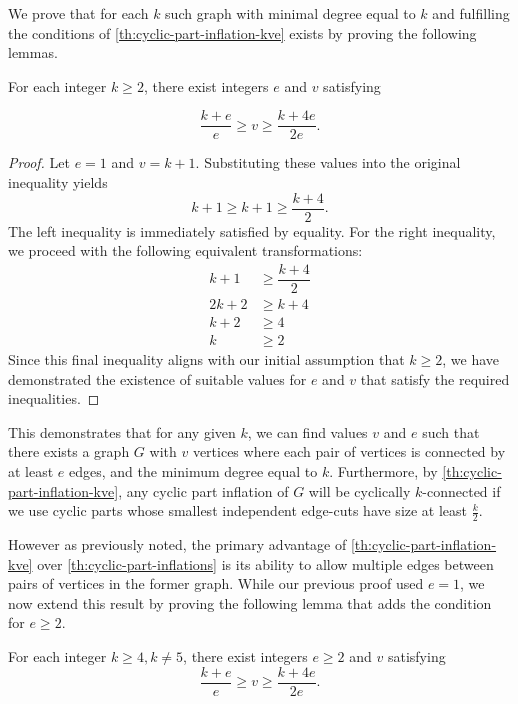 \documentclass[12pt, twoside]{book}
\begin{document}
We prove that for each $k$ such graph with minimal degree equal to $k$ and fulfilling the conditions of \cref{th:cyclic-part-inflation-kve} exists by proving the following lemmas.

\begin{lemma}
	For each integer $k\geq 2$, there exist integers $e$ and $v$ satisfying
	
	$$\dfrac{k+e}{e}\geq v\geq \dfrac{k+4e}{2e}.$$
\end{lemma}

\begin{proof}
	Let $e=1$ and $v=k+1$. Substituting these values into the original inequality yields
	$$k+1\geq k+1\geq \dfrac{k+4}{2}.$$
	The left inequality is immediately satisfied by equality. For the right inequality, we proceed with the following equivalent transformations:
	\begin{align*}
		k+1&\geq \dfrac{k+4}{2} \\
		2k+2&\geq k+4 \\
		k+2&\geq 4 \\
		k&\geq 2
	\end{align*}
	Since this final inequality aligns with our initial assumption that $k\geq 2$, we have demonstrated the existence of suitable values for $e$ and $v$ that satisfy the required inequalities.
\end{proof}

This demonstrates that for any given $k$, we can find values $v$ and $e$ such that there exists a graph $G$ with $v$ vertices where each pair of vertices is connected by at least $e$ edges, and the minimum degree equal to $k$. Furthermore, by \cref{th:cyclic-part-inflation-kve}, any cyclic part inflation of $G$ will be cyclically $k$-connected if we use cyclic parts whose smallest independent edge-cuts have size at least $\frac{k}{2}$.

However as previously noted, the primary advantage of \cref{th:cyclic-part-inflation-kve} over \cref{th:cyclic-part-inflations} is its ability to allow multiple edges between pairs of vertices in the former graph. While our previous proof used $e=1$, we now extend this result by proving the following lemma that adds the condition for $e\geq 2$.

\begin{lemma}
	For each integer $k\geq 4, k\neq 5$, there exist integers $e\geq 2$ and $v$ satisfying
	$$\dfrac{k+e}{e}\geq v\geq \dfrac{k+4e}{2e}.$$
\end{lemma}
\end{document}

